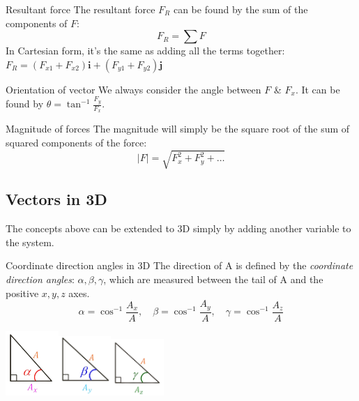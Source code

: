 \documentclass{article}
\begin{document}
\begin{knBox}
  {Resultant force}
  The resultant force $F_R$ can be found by the sum of the components of $F$:
  \[F_R=\sum F\]
  In Cartesian form, it's the same as adding all the terms together: $F_R=(F_{x1}+F_{x2})\boldsymbol{i}+(F_{y1}+F_{y2})\boldsymbol{j}$
\end{knBox}
\begin{knBox}
  {Orientation of vector}
  We always consider the angle between $F$ \& $F_x$. It can be found by $\theta=\tan^{-1}\frac{F_y}{F_x}$.
\end{knBox}
\begin{knBox}
  {Magnitude of forces}
  The magnitude will simply be the square root of the sum of squared components of the force:
  \[|F|=\sqrt{F_x^2+F_y^2+\dots}\]

\end{knBox}
\subsection{Vectors in 3D}
The concepts above can be extended to 3D simply by adding another variable to the system.
\begin{knBox}
  {Coordinate direction angles in 3D}
  The direction of A is defined by the \emph{coordinate direction angles}: $\alpha, \beta, \gamma$, which are measured between the tail of A and the positive $x, y, z$ axes.
  \[\alpha=\cos^{-1}\frac{A_x}{A},\quad\beta=\cos^{-1}\frac{A_y}{A},\quad\gamma=\cos^{-1}\frac{A_z}{A}\]
  \begin{center}
    \includegraphics[width=2cm]{img/Ax.png}\includegraphics[width=2cm]{img/Ay.png}\includegraphics[width=2cm]{img/Az.png}
  \end{center}
\end{knBox}
\end{document}
